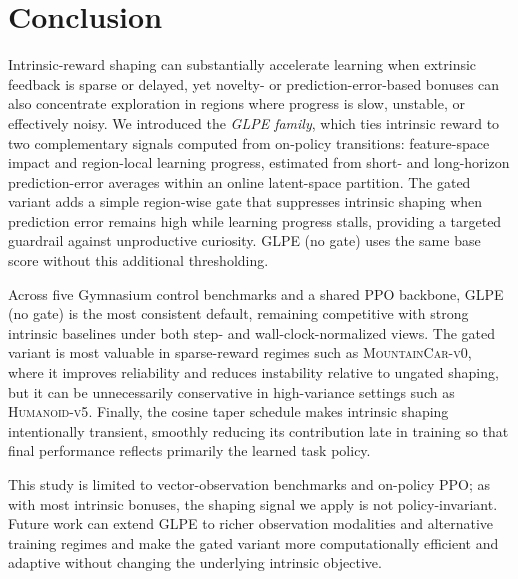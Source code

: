 \section{Conclusion}
\label{sec:conclusion}

Intrinsic-reward shaping can substantially accelerate learning when extrinsic feedback is sparse or delayed, yet novelty- or prediction-error-based bonuses can also concentrate exploration in regions where progress is slow, unstable, or effectively noisy.
We introduced the \emph{GLPE family}, which ties intrinsic reward to two complementary signals computed from on-policy transitions: feature-space impact and region-local learning progress, estimated from short- and long-horizon prediction-error averages within an online latent-space partition.
The gated variant adds a simple region-wise gate that suppresses intrinsic shaping when prediction error remains high while learning progress stalls, providing a targeted guardrail against unproductive curiosity.
GLPE (no gate) uses the same base score without this additional thresholding.

Across five Gymnasium control benchmarks and a shared PPO backbone, GLPE (no gate) is the most consistent default, remaining competitive with strong intrinsic baselines under both step- and wall-clock-normalized views.
The gated variant is most valuable in sparse-reward regimes such as \textsc{MountainCar-v0}, where it improves reliability and reduces instability relative to ungated shaping, but it can be unnecessarily conservative in high-variance settings such as \textsc{Humanoid-v5}.
Finally, the cosine taper schedule makes intrinsic shaping intentionally transient, smoothly reducing its contribution late in training so that final performance reflects primarily the learned task policy.

This study is limited to vector-observation benchmarks and on-policy PPO; as with most intrinsic bonuses, the shaping signal we apply is not policy-invariant.
Future work can extend GLPE to richer observation modalities and alternative training regimes and make the gated variant more computationally efficient and adaptive without changing the underlying intrinsic objective.
